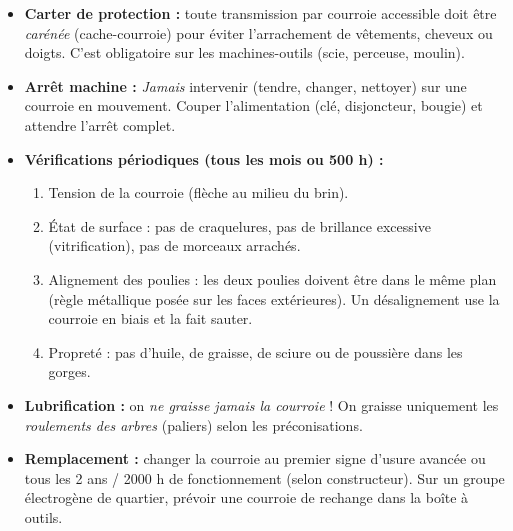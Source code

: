 \documentclass[11pt]{article}
\begin{document}
\begin{aretenir}
\begin{itemize}
\item \textbf{Carter de protection :} toute transmission par courroie accessible doit être \emph{carénée} (cache-courroie) pour éviter l'arrachement de vêtements, cheveux ou doigts. C'est obligatoire sur les machines-outils (scie, perceuse, moulin).
\item \textbf{Arrêt machine :} \emph{Jamais} intervenir (tendre, changer, nettoyer) sur une courroie en mouvement. Couper l'alimentation (clé, disjoncteur, bougie) et attendre l'arrêt complet.
\item \textbf{Vérifications périodiques (tous les mois ou 500 h) :}
      \begin{enumerate}
      \item Tension de la courroie (flèche au milieu du brin).
      \item État de surface : pas de craquelures, pas de brillance excessive (vitrification), pas de morceaux arrachés.
      \item Alignement des poulies : les deux poulies doivent être dans le même plan (règle métallique posée sur les faces extérieures). Un désalignement use la courroie en biais et la fait sauter.
      \item Propreté : pas d'huile, de graisse, de sciure ou de poussière dans les gorges.
      \end{enumerate}
\item \textbf{Lubrification :} on \emph{ne graisse jamais la courroie} ! On graisse uniquement les \emph{roulements des arbres} (paliers) selon les préconisations.
\item \textbf{Remplacement :} changer la courroie au premier signe d'usure avancée ou tous les 2 ans / 2000 h de fonctionnement (selon constructeur). Sur un groupe électrogène de quartier, prévoir une courroie de rechange dans la boîte à outils.
\end{itemize}
\end{aretenir}
\end{document}

